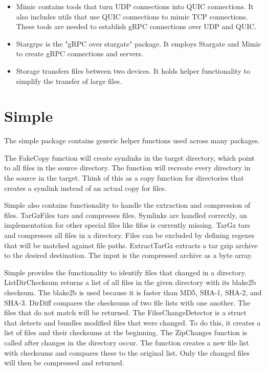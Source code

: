 \begin{itemize}
    \item Mimic contains tools that turn UDP connections into QUIC connections. It also includes utils that use QUIC connections to mimic TCP connections. These tools are needed to establish gRPC connections over UDP and QUIC.
    
    \item Stargrpc is the "gRPC over stargate" package. It employs Stargate and Mimic to create gRPC connections and servers.
    
    \item Storage transfers files between two devices. It holds helper functionality to simplify the transfer of large files.
\end{itemize}

\section{Simple}
The simple package contains generic helper functions used across many packages.

The FakeCopy function will create symlinks in the target directory, which point to all files in the source directory. The function will recreate every directory in the source in the target. Think of this as a copy function for directories that creates a symlink instead of an actual copy for files.

Simple also contains functionality to handle the extraction and compression of files. TarGzFiles tars and compresses files. Symlinks are handled correctly, an implementation for other special files like fifos is currently missing. TarGz tars and compresses all files in a directory. Files can be excluded by defining regexes that will be matched against file paths. ExtractTarGz extracts a tar gzip archive to the desired destination. The input is the compressed archive as a byte array.

Simple provides the functionality to identify files that changed in a directory. ListDirChecksum returns a list of all files in the given directory with its blake2b checksum. The blake2b is used because it is faster than MD5, SHA-1, SHA-2, and SHA-3. DirDiff compares the checksums of two file lists with one another. The files that do not match will be returned. The FilesChangeDetector is a struct that detects and bundles modified files that were changed. To do this, it creates a list of files and their checksums at the beginning. The ZipChanges function is called after changes in the directory occur. The function creates a new file list with checksums and compares these to the original list. Only the changed files will then be compressed and returned.

